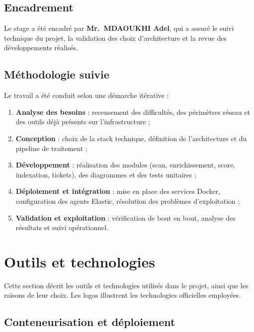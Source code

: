 \documentclass[11pt,a4paper]{article}
\begin{document}
\subsection{Encadrement}

Le stage a \'et\'e encadr\'e par \textbf{Mr.~MDAOUKHI Adel}, qui a assur\'e le
suivi technique du projet, la validation des choix d'architecture et la revue
des d\'eveloppements r\'ealis\'es.

\subsection{M\'ethodologie suivie}

Le travail a \'et\'e conduit selon une d\'emarche it\'erative :

\begin{enumerate}[leftmargin=1.6em]
  \item \textbf{Analyse des besoins} : recensement des difficult\'es, des
        p\'erim\`etres r\'eseau et des outils d\'ej\`a pr\'esents sur
        l'infrastructure ;
  \item \textbf{Conception} : choix de la stack technique, d\'efinition de
        l'architecture et du pipeline de traitement ;
  \item \textbf{D\'eveloppement} : r\'ealisation des modules (scan,
        enrichissement, score, indexation, tickets), des diagrammes et des
        tests unitaires ;
  \item \textbf{D\'eploiement et int\'egration} : mise en place des services
        Docker, configuration des agents Elastic, r\'esolution des
        probl\`emes d'exploitation ;
  \item \textbf{Validation et exploitation} : v\'erification de bout en bout,
        analyse des r\'esultats et suivi op\'erationnel.
\end{enumerate}

\section{Outils et technologies}

Cette section d\'ecrit les outils et technologies utilis\'es dans le projet,
ainsi que les raisons de leur choix. Les logos illustrent les technologies
officielles employ\'ees.

\subsection{Conteneurisation et d\'eploiement}
\end{document}
